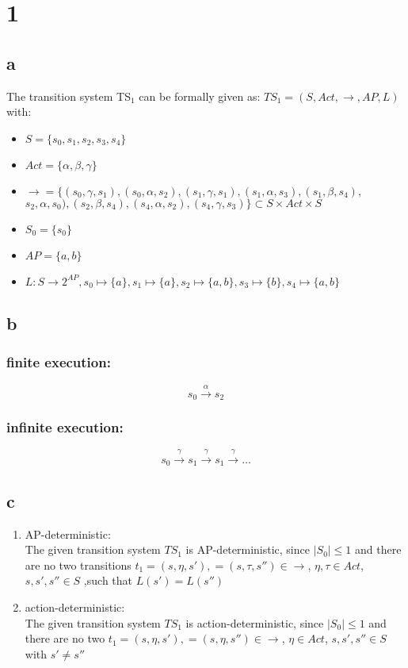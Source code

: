 \documentclass[11pt]{article}
\begin{document}
\section{1}
\subsection{a}

The transition system TS$_1$ can be formally given as: $TS_1 = (S, Act, \rightarrow, AP, L)$ with:
\begin{itemize}
	\item $S = \{s_0,s_1,s_2,s_3, s_4\}$
	\item $Act = \{\alpha, \beta, \gamma \}$
	\item $\rightarrow = \{ (s_0, \gamma, s_1), (s_0, \alpha, s_2), (s_1, \gamma, s_1), (s_1, \alpha, s_3),(s_1, \beta, s_4), $\\
		  \hspace*{2cm} $s_2, \alpha, s_0), (s_2, \beta, s_4), (s_4, \alpha, s_2), (s_4, \gamma, s_3)  \} \subset S \times Act \times S$
	\item $S_0=\{s_0\}$
	\item $AP = \{a, b\}$
	\item $L: S \rightarrow 2^{AP}, s_0 \mapsto \{a\}, s_1 \mapsto \{a\}, s_2 \mapsto \{a,b\}, s_3 \mapsto \{b\}, s_4 \mapsto \{a,b\}$
\end{itemize}

\subsection{b}

\subsubsection{finite execution:} 
$$s_0 \xrightarrow{\alpha} s_2$$
\subsubsection{infinite execution:} 
$$s_0 \xrightarrow{\gamma} s_1 \xrightarrow{\gamma} s_1 \xrightarrow{\gamma} \dots$$


\subsection{c}

\begin{enumerate}[label=\roman*)]
	\item AP-deterministic: \\
		The given transition system $TS_1$ is AP-deterministic, since $|S_0|\le 1$ and there are no two transitions $t_1=(s, \eta , s'),= (s, \tau, s'') \in \rightarrow$, $\eta, \tau \in Act$, $s, s', s'' \in S$ ,such that $L(s') = L(s'')$
	\item action-deterministic: \\
		The given transition system $TS_1$ is action-deterministic, since $|S_0|\le 1$ and there are no two $t_1=(s, \eta , s'),= (s, \eta, s'') \in \rightarrow$, $\eta \in Act$, $s, s', s'' \in S$ with $s' \neq s''$
\end{enumerate}
\end{document}
